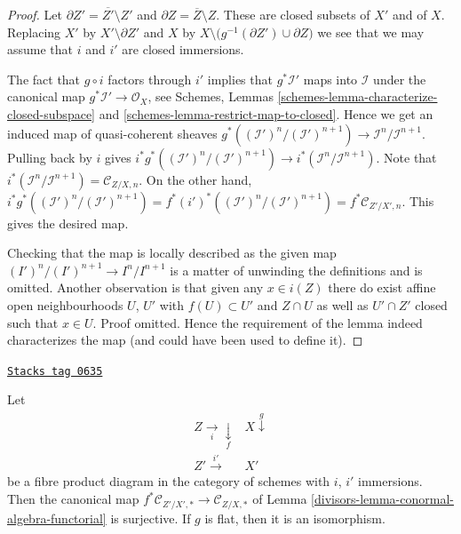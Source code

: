 \begin{proof}
Let $\partial Z' = \overline{Z'} \setminus Z'$ and
$\partial Z = \overline{Z} \setminus Z$. These are closed subsets of $X'$ and
of $X$. Replacing $X'$ by $X' \setminus \partial Z'$ and $X$ by
$X \setminus \big(g^{-1}(\partial Z') \cup \partial Z\big)$ we
see that we may assume that $i$ and $i'$ are closed immersions.

\medskip\noindent
The fact that $g \circ i$ factors through $i'$ implies that
$g^*\mathcal{I}'$ maps into $\mathcal{I}$ under the canonical
map $g^*\mathcal{I}' \to \mathcal{O}_X$, see
Schemes, Lemmas
\ref{schemes-lemma-characterize-closed-subspace} and
\ref{schemes-lemma-restrict-map-to-closed}.
Hence we get an induced map of quasi-coherent sheaves
$g^*((\mathcal{I}')^n/(\mathcal{I}')^{n + 1}) \to
\mathcal{I}^n/\mathcal{I}^{n + 1}$.
Pulling back by $i$ gives
$i^*g^*((\mathcal{I}')^n/(\mathcal{I}')^{n + 1}) \to
i^*(\mathcal{I}^n/\mathcal{I}^{n + 1})$.
Note that
$i^*(\mathcal{I}^n/\mathcal{I}^{n + 1}) = \mathcal{C}_{Z/X, n}$.
On the other hand,
$i^*g^*((\mathcal{I}')^n/(\mathcal{I}')^{n + 1}) =
f^*(i')^*((\mathcal{I}')^n/(\mathcal{I}')^{n + 1}) =
f^*\mathcal{C}_{Z'/X', n}$.
This gives the desired map.

\medskip\noindent
Checking that the map is locally described as the given map
$(I')^n/(I')^{n + 1} \to I^n/I^{n + 1}$ is a matter of unwinding the
definitions and is omitted. Another observation is that given any
$x \in i(Z)$ there do exist affine open neighbourhoods $U$, $U'$
with $f(U) \subset U'$ and $Z \cap U$ as well as $U' \cap Z'$
closed such that $x \in U$. Proof omitted. Hence the requirement
of the lemma indeed characterizes the map (and could have been used
to define it).
\end{proof}

\begin{lemma}
\label{divisors-lemma-conormal-algebra-functorial-flat}
\href{https://stacks.math.columbia.edu/tag/0635}{\texttt{Stacks tag 0635}}

Let
$$
\begin{array}{cc}Z \underset{i}{\longrightarrow}\underset{f}{\downarrow} & X \overset{g}{\downarrow} \\ Z' \overset{i'}{\longrightarrow} & X'\end{array}
$$
be a fibre product diagram in the category of schemes with
$i$, $i'$ immersions. Then the canonical map
$f^*\mathcal{C}_{Z'/X', *} \to \mathcal{C}_{Z/X, *}$ of
Lemma \ref{divisors-lemma-conormal-algebra-functorial}
is surjective. If $g$ is flat, then it is an isomorphism.
\end{lemma}

